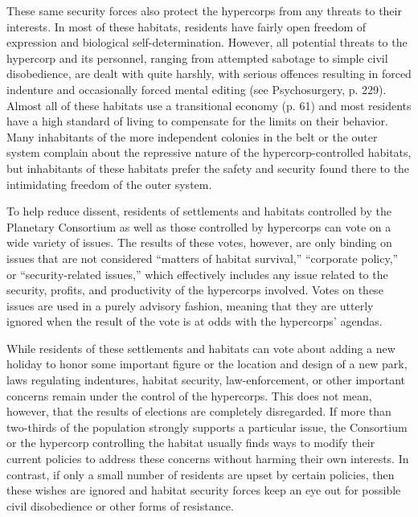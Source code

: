 These same security forces also protect the hypercorps from any threats to their interests. In most of these habitats, residents have fairly open freedom of expression and biological self-determination. However, all potential threats to the hypercorp and its personnel, ranging from attempted sabotage to simple civil disobedience, are dealt with quite harshly, with serious offences resulting in forced indenture and occasionally forced mental editing (see Psychosurgery, p. 229). Almost all of these habitats use a transitional economy (p. 61) and most residents have a high standard of living to compensate for the limits on their behavior. Many inhabitants of the more independent colonies in the belt or the outer system complain about the repressive nature of the hypercorp-controlled habitats, but inhabitants of these habitats prefer the safety and security found there to the intimidating freedom of the outer system. 

To help reduce dissent, residents of settlements and habitats controlled by the Planetary Consortium as well as those controlled by hypercorps can vote on a wide variety of issues. The results of these votes, however, are only binding on issues that are not considered “matters of habitat survival,” “corporate policy,” or “security-related issues,” which effectively includes any issue related to the security, profits, and productivity of the hypercorps involved. Votes on these issues are used in a purely advisory fashion, meaning that they are utterly ignored when the result of the vote is at odds with the hypercorps' agendas. 

While residents of these settlements and habitats can vote about adding a new holiday to honor some important figure or the location and design of a new park, laws regulating indentures, habitat security, law-enforcement, or other important concerns remain under the control of the hypercorps. This does not mean, however, that the results of elections are completely disregarded. If more than two-thirds of the population strongly supports a particular issue, the Consortium or the hypercorp controlling the habitat usually finds ways to modify their current policies to address these concerns without harming their own interests. In contrast, if only a small number of residents are upset by certain policies, then these wishes are ignored and habitat security forces keep an eye out for possible civil disobedience or other forms of resistance. 

